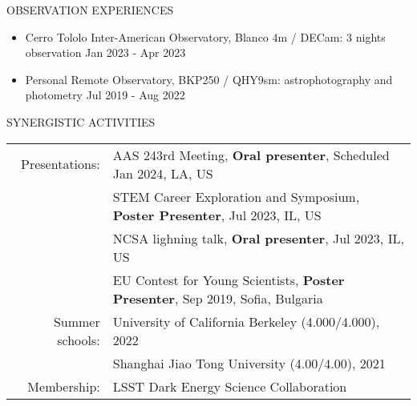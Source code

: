 \documentclass[10pt]{article} %
\begin{document}
\begin{section}{OBSERVATION EXPERIENCES}
    
\begin{itemize}[leftmargin=1.5em]
    \item Cerro Tololo Inter-American Observatory, Blanco 4m / DECam: 3 nights observation \hfill Jan 2023 - Apr 2023
    \item Personal Remote Observatory, BKP250 / QHY9sm: astrophotography and photometry \hfill Jul 2019 - Aug 2022
\end{itemize}

\end{section}

\begin{section}{SYNERGISTIC ACTIVITIES}

\begin{tabular}{rl}
    Presentations: & AAS 243rd Meeting, \textbf{Oral presenter}, Scheduled Jan 2024, LA, US \\
    & STEM Career Exploration and Symposium, \textbf{Poster Presenter}, Jul 2023, IL, US \\
    & NCSA lighning talk, \textbf{Oral presenter}, Jul 2023, IL, US \\
    & EU Contest for Young Scientists, \textbf{Poster Presenter}, Sep 2019, Sofia, Bulgaria \\
    Summer schools: & University of California Berkeley (4.000/4.000), 2022 \\
    & Shanghai Jiao Tong University (4.00/4.00), 2021 \\
    Membership: &LSST Dark Energy Science Collaboration
\end{tabular}

\end{section}
\end{document}

